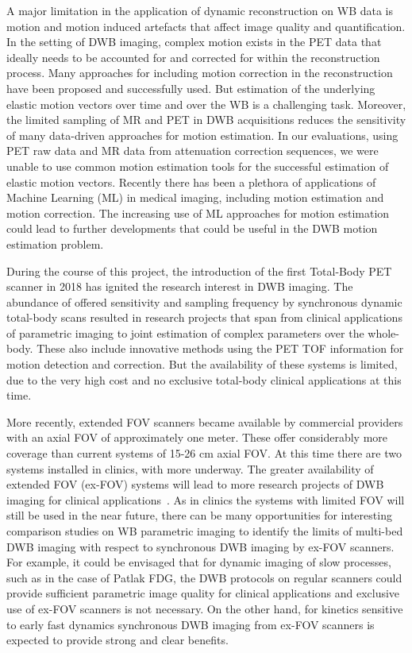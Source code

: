 A major limitation in the application of dynamic reconstruction on WB data is motion and motion induced artefacts that affect image quality and quantification. 
In the setting of DWB imaging, complex motion exists in the PET data that ideally needs to be accounted for and corrected for within the reconstruction process. 
Many approaches for including motion correction in the reconstruction have been proposed and successfully used. But estimation of the underlying elastic motion vectors over time and over the WB is a challenging task. Moreover, the limited sampling of MR and PET in DWB acquisitions reduces the sensitivity of many data-driven approaches for motion estimation. In our evaluations, using PET raw data and MR data from attenuation correction sequences, we were unable to use common motion estimation tools for the successful estimation of elastic motion vectors.
Recently there has been a plethora of applications of Machine Learning (ML) in medical imaging, including motion estimation and motion correction.
The increasing use of ML approaches for motion estimation could lead to further developments that could be useful in the DWB motion estimation problem.

During the course of this project, the introduction of the first Total-Body PET scanner in 2018 has ignited the research interest in DWB imaging. The abundance of offered sensitivity and sampling frequency by synchronous dynamic total-body scans resulted in research projects that span from clinical applications of parametric imaging to joint estimation of complex parameters over the whole-body. These also include innovative methods using the PET TOF information for motion detection and correction.
But the availability of these systems is limited, due to the very high cost and no exclusive total-body clinical applications at this time.

More recently, extended FOV scanners became available by commercial providers with an axial FOV of approximately one meter. These offer considerably more coverage than current systems of 15-26 cm axial FOV. At this time there are two systems installed in clinics, with more underway. The greater availability of extended FOV (ex-FOV) systems will lead to more research projects of DWB imaging for clinical applications~\cite{Slart2021}. As in clinics the systems with limited FOV will still be used in the near future, there can be many opportunities for interesting comparison studies on WB parametric imaging to identify the limits of multi-bed DWB imaging with respect to synchronous DWB imaging by ex-FOV scanners.
For example, it could be envisaged that for dynamic imaging of slow processes, such as in the case of Patlak FDG, the DWB protocols on regular scanners could provide sufficient parametric image quality for clinical applications and exclusive use of ex-FOV scanners is not necessary. On the other hand, for kinetics sensitive to early fast dynamics synchronous DWB imaging from ex-FOV scanners is expected to provide strong and clear benefits.


